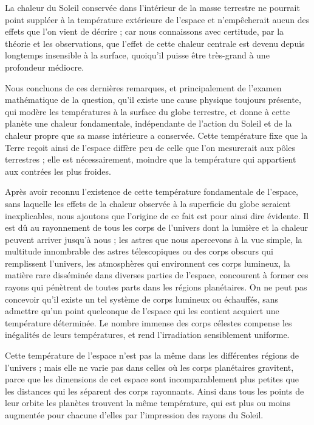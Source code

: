 \documentclass[a4paper, 11pt, oneside, landscape]{article}
\begin{document}
La chaleur du Soleil conservée dans l'intérieur de la masse terrestre ne pourrait point suppléer à la température extérieure de l'espace et n'empêcherait aucun des effets que l'on vient de décrire ; car nous connaissons avec certitude, par la théorie et les observations, que l'effet de cette chaleur centrale est devenu depuis longtemps insensible à la surface, quoiqu'il puisse être très-grand à une profondeur médiocre.

Nous concluons de ces dernières remarques, et principalement de l'examen mathématique de la question, qu'il existe une cause physique toujours présente, qui modère les températures à la surface du globe terrestre, et donne à cette planète une chaleur fondamentale, indépendante de l'action du Soleil et de la chaleur propre que sa masse intérieure a conservée. Cette température fixe que la Terre reçoit ainsi de l'espace diffère peu de celle que l'on mesurerait aux pôles terrestres ; elle est nécessairement, moindre que la température qui appartient aux contrées les plus froides.

Après avoir reconnu l'existence de cette température fondamentale de l'espace, sans laquelle les effets de la chaleur observée à la superficie du globe seraient inexplicables, nous ajoutons que l'origine de ce fait est pour ainsi dire évidente. Il est dû au rayonnement de tous les corps de l'univers dont la lumière et la chaleur peuvent arriver jusqu'à nous ; les astres que nous apercevons à la vue simple, la multitude innombrable des astres télescopiques ou des corps obscurs qui remplissent l'univers, les atmosphères qui environnent ces corps lumineux, la matière rare disséminée dans diverses parties de l'espace, concourent à former ces rayons qui pénètrent de toutes parts dans les régions planétaires. On ne peut pas concevoir qu'il existe un tel système de corps lumineux ou échauffés, sans admettre qu'un point quelconque de l'espace qui les contient acquiert une température déterminée. Le nombre immense des corps célestes compense les inégalités de leurs températures, et rend l'irradiation sensiblement uniforme.

Cette température de l'espace n'est pas la même dans les différentes régions de l'univers ; mais elle ne varie pas dans celles où les corps planétaires gravitent, parce que les dimensions de cet espace sont incomparablement plus petites que les distances qui les séparent des corps rayonnants. Ainsi dans tous les points de leur orbite les planètes trouvent la même température, qui est plus ou moins augmentée pour chacune d'elles par l'impression des rayons du Soleil.
\end{document}
